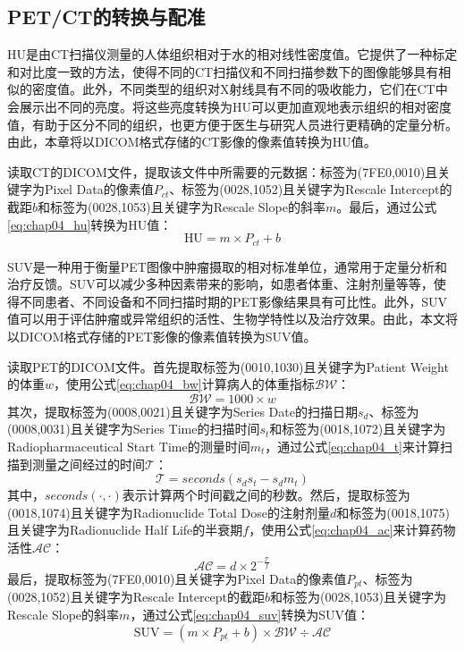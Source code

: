 \subsection{PET/CT的转换与配准}

HU是由CT扫描仪测量的人体组织相对于水的相对线性密度值。它提供了一种标定和对比度一致的方法，使得不同的CT扫描仪和不同扫描参数下的图像能够具有相似的密度值。此外，不同类型的组织对X射线具有不同的吸收能力，它们在CT中会展示出不同的亮度。将这些亮度转换为HU可以更加直观地表示组织的相对密度值，有助于区分不同的组织，也更方便于医生与研究人员进行更精确的定量分析。由此，本章将以DICOM格式存储的CT影像的像素值转换为HU值。

读取CT的DICOM文件，提取该文件中所需要的元数据：标签为(7FE0,0010)且关键字为Pixel Data的像素值\(P_{ct}\)、标签为(0028,1052)且关键字为Rescale Intercept的截距\(b\)和标签为(0028,1053)且关键字为Rescale Slope的斜率\(m\)。最后，通过公式\ref{eq:chap04_hu}转换为HU值：
\begin{equation}
  \text{HU} = m \times P_{ct} + b
  \label{eq:chap04_hu}
\end{equation}

SUV是一种用于衡量PET图像中肿瘤摄取的相对标准单位，通常用于定量分析和治疗反馈。SUV可以减少多种因素带来的影响，如患者体重、注射剂量等等，使得不同患者、不同设备和不同扫描时期的PET影像结果具有可比性。此外，SUV值可以用于评估肿瘤或异常组织的活性、生物学特性以及治疗效果。由此，本文将以DICOM格式存储的PET影像的像素值转换为SUV值。

读取PET的DICOM文件。首先提取标签为(0010,1030)且关键字为Patient Weight的体重\(w\)，使用公式\ref{eq:chap04_bw}计算病人的体重指标\(\mathcal{BW}\)：
\begin{equation}
  \mathcal{BW} = 1000 \times w
  \label{eq:chap04_bw}
\end{equation}
其次，提取标签为(0008,0021)且关键字为Series Date的扫描日期\(s_d\)、标签为(0008,0031)且关键字为Series Time的扫描时间\(s_t\)和标签为(0018,1072)且关键字为Radiopharmaceutical Start Time的测量时间\(m_t\)，通过公式\ref{eq:chap04_t}来计算扫描到测量之间经过的时间\(\mathcal{T}\)：
\begin{equation}
  \mathcal{T} = seconds(s_ds_t - s_dm_t)
  \label{eq:chap04_t}
\end{equation}
其中，\(seconds(\cdot, \cdot)\)表示计算两个时间戳之间的秒数。然后，提取标签为(0018,1074)且关键字为Radionuclide Total Dose的注射剂量\(d\)和标签为(0018,1075)且关键字为Radionuclide Half Life的半衰期\(f\)，使用公式\ref{eq:chap04_ac}来计算药物活性\(\mathcal{AC}\)：
\begin{equation}
  \mathcal{AC} = d \times 2^{-\frac{\mathcal{T}}{f}}
  \label{eq:chap04_ac}
\end{equation}
最后，提取标签为(7FE0,0010)且关键字为Pixel Data的像素值\(P_{pt}\)、标签为(0028,1052)且关键字为Rescale Intercept的截距\(b\)和标签为(0028,1053)且关键字为Rescale Slope的斜率\(m\)，通过公式\ref{eq:chap04_suv}转换为SUV值：
\begin{equation}
  \text{SUV} = (m \times P_{pt} + b) \times \mathcal{BW} \div \mathcal{AC}
  \label{eq:chap04_suv}
\end{equation}


